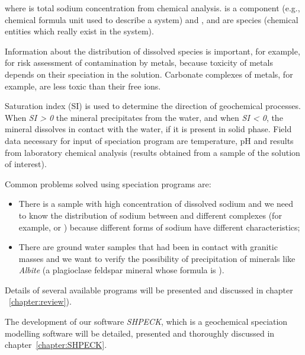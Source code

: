where  is total sodium concentration from chemical analysis.  is a component (e.g., chemical formula unit used to describe a system) and ,  and  are species (chemical entities which really exist in the system). 

Information about the distribution of dissolved species is important, for example, for risk assessment of contamination by metals, because toxicity of metals depends on their speciation in the solution. Carbonate complexes of metals, for example, are less toxic than their free ions.

Saturation index (SI) is used to determine the direction of geochemical processes. When \emph{SI > 0} the mineral precipitates from the water, and when \emph{SI < 0}, the mineral dissolves in contact with the water, if it is present in solid phase. Field data necessary for input of speciation program are temperature, pH and results from laboratory chemical analysis (results obtained from a sample of the solution of interest).

Common problems solved using speciation programs are: 
\begin{itemize}
\item There is a sample with high concentration of dissolved sodium and we need to know the distribution of sodium between  and different complexes (for example,  or ) because different forms of sodium have different characteristics;
\item There are ground water samples that had been in contact with granitic masses and we want to verify the possibility of precipitation of minerals like \emph{Albite} (a plagioclase feldspar mineral whose formula is \emph{}).
\end{itemize}

Details of several available programs will be presented and discussed in chapter ~\ref{chapter:review}).

The development of our software \emph{SHPECK}, which is a geochemical speciation modelling software will be detailed, presented and thoroughly discussed in chapter~\ref{chapter:SHPECK}. 


